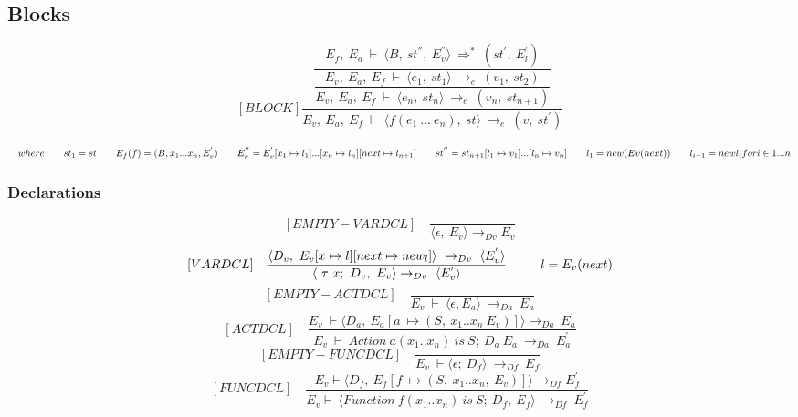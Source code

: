\subsection{Blocks}
	\[	
	[BLOCK]	
	\dfrac{\dfrac{E_f, \ E_a \ \vdash \ \langle B, \ st^{''}, \ E_v^{''} \rangle \ \Rightarrow^* \ (st^{'}, \ E_l^{'})}{\dfrac{E_v, \ E_a, \ E_f \ \vdash \ \langle e_1, \ st_1 \rangle \ \rightarrow_e \ (v_1, \ st_2)}{E_v, \ E_a, \ E_f \ \vdash \ \langle e_n, \ st_n \rangle \ \rightarrow_e \ (v_n, \ st_{n+1})}}}{E_v, \ E_a, \ E_f \ \vdash \ \langle f(e_1 \ ... \ e_n), \ st \rangle \ \rightarrow_e \ (v, \ st^{'})}	
	\]
	
\begin{math}		
	\quad where \newline		
	\qquad st_1 = st \newline		
	\qquad E_f(f) = (B, x_1 ... x_n, E_v^{'}) \newline		
	\qquad E_v^{''} = E_v^{'}[x_1 \mapsto l_1] ... [x_n \mapsto l_n] [next \mapsto l_{n+1}] \newline		
	\qquad st^{''} = st_{n+1}[l_1 \mapsto v_1] ... [l_n \mapsto v_n] \newline		
	\qquad l_1 = new (Ev(next)) \newline		
	\qquad l_{i+1}= new l_i for i \in {1 ... n}		
\end{math}
	
\subsubsection{Declarations}	
	\[	
	[EMPTY-VARDCL] \quad	
	\dfrac{}{\langle\epsilon, \ E_v\rangle \rightarrow_{Dv} E_v}	
	\]\newline
	\[	
	[VARDCL] \quad	
	\dfrac{ \langle D_v, \ E_v[x \mapsto l][next \mapsto new_l]\rangle \ \rightarrow_{Dv} \ \langle E_v^{'} \rangle }{ \langle \ \tau \ x; \ D_v,\ E_v \rangle \rightarrow_{Dv} \ \langle E_v^{'} \rangle } \newline	
	\qquad \ \ l = E_v(next)	
	\]\newline
	\[	
	[EMPTY-ACTDCL] \quad	
	\dfrac{}{E_v \ \vdash \ \langle \epsilon, E_a \rangle \ \rightarrow_{Da} \ E_a}	
	\]\newline
	\[	
	[ACTDCL] \quad	
	\dfrac{E_v \ \vdash \langle D_a, \ E_a[a \ \mapsto (S, \ x_1 .. x_n \ E_v)] \rangle \rightarrow_{Da} \ E_a^{'}}{E_v \ \vdash \ Action \ a(x_1 .. x_n) \ is \ S; \ D_a \ E_a \ \rightarrow_{Da} \ E_a^{'}}	
	\]\newline
	\[	
	[EMPTY-FUNCDCL] \quad	
	\dfrac{}{E_v \ \vdash \langle \epsilon; \ D_f \rangle \ \rightarrow_{Df} \ E_f}	
	\]\newline
	\[	
	[FUNCDCL] \quad	
	\dfrac{E_v \vdash \langle D_f, \ E_f[f \ \mapsto (S, \ x_1 .. x_n, \ E_v)] \rangle \rightarrow_{Df} E_f^{'}}{E_v \vdash \ \langle Function \ f(x_1 .. x_n) \ is \ S; \ D_f, \ E_f \rangle \ \rightarrow_{Df} \ E_f^{'}}	
	\]

